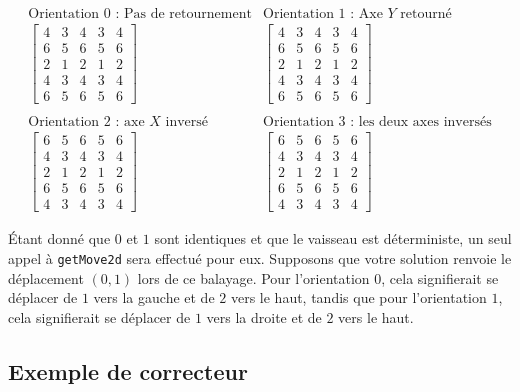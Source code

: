 \documentclass[12pt]{article}
\begin{document}
\[
\begin{array}{cc}
\text{Orientation $0$ : Pas de retournement} & \text{Orientation $1$ : Axe $Y$ retourné} \\
\left[
\begin{array}{ccccc}
4 & 3 & 4 & 3 & 4 \\
6 & 5 & 6 & 5 & 6 \\
2 & 1 & 2 & 1 & 2 \\
4 & 3 & 4 & 3 & 4 \\
6 & 5 & 6 & 5 & 6
\end{array}
\right]
&
\left[
\begin{array}{ccccc}
4 & 3 & 4 & 3 & 4 \\
6 & 5 & 6 & 5 & 6 \\
2 & 1 & 2 & 1 & 2 \\
4 & 3 & 4 & 3 & 4 \\
6 & 5 & 6 & 5 & 6
\end{array}
\right]
\\
\\
\text{Orientation $2$ : axe $X$ inversé} & \text{Orientation $3$ : les deux axes inversés} \\
\left[
\begin{array}{ccccc}
6 & 5 & 6 & 5 & 6 \\
4 & 3 & 4 & 3 & 4 \\
2 & 1 & 2 & 1 & 2 \\
6 & 5 & 6 & 5 & 6 \\
4 & 3 & 4 & 3 & 4
\end{array}
\right]
&
\left[
\begin{array}{ccccc}
6 & 5 & 6 & 5 & 6 \\
4 & 3 & 4 & 3 & 4 \\
2 & 1 & 2 & 1 & 2 \\
6 & 5 & 6 & 5 & 6 \\
4 & 3 & 4 & 3 & 4
\end{array}
\right]
\end{array}
\] 

Étant donné que $0$ et $1$ sont identiques et que le vaisseau est déterministe, un seul appel à \verb|getMove2d| sera effectué pour eux. Supposons que votre solution renvoie le déplacement $(0, 1)$ lors de ce balayage. Pour l'orientation $0$, cela signifierait se déplacer de $1$ vers la gauche et de $2$ vers le haut, tandis que pour l'orientation $1$, cela signifierait se déplacer de $1$ vers la droite et de $2$ vers le haut.

\subsection{Exemple de correcteur}
\end{document}
